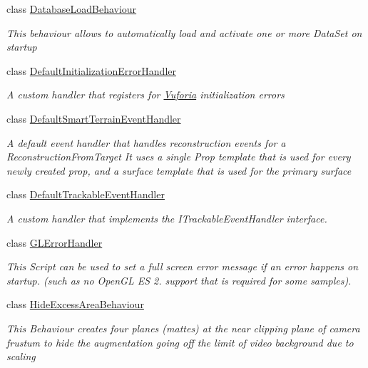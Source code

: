 \begin{DoxyCompactItemize}
class \hyperlink{class_vuforia_1_1_database_load_behaviour}{Database\+Load\+Behaviour}
\begin{DoxyCompactList}\small\item\em This behaviour allows to automatically load and activate one or more Data\+Set on startup \end{DoxyCompactList}\item 
class \hyperlink{class_vuforia_1_1_default_initialization_error_handler}{Default\+Initialization\+Error\+Handler}
\begin{DoxyCompactList}\small\item\em A custom handler that registers for \hyperlink{namespace_vuforia}{Vuforia} initialization errors \end{DoxyCompactList}\item 
class \hyperlink{class_vuforia_1_1_default_smart_terrain_event_handler}{Default\+Smart\+Terrain\+Event\+Handler}
\begin{DoxyCompactList}\small\item\em A default event handler that handles reconstruction events for a Reconstruction\+From\+Target It uses a single Prop template that is used for every newly created prop, and a surface template that is used for the primary surface \end{DoxyCompactList}\item 
class \hyperlink{class_vuforia_1_1_default_trackable_event_handler}{Default\+Trackable\+Event\+Handler}
\begin{DoxyCompactList}\small\item\em A custom handler that implements the I\+Trackable\+Event\+Handler interface. \end{DoxyCompactList}\item 
class \hyperlink{class_vuforia_1_1_g_l_error_handler}{G\+L\+Error\+Handler}
\begin{DoxyCompactList}\small\item\em This Script can be used to set a full screen error message if an error happens on startup. (such as no Open\+G\+L E\+S 2. support that is required for some samples). \end{DoxyCompactList}\item 
class \hyperlink{class_vuforia_1_1_hide_excess_area_behaviour}{Hide\+Excess\+Area\+Behaviour}
\begin{DoxyCompactList}\small\item\em This Behaviour creates four planes (mattes) at the near clipping plane of camera frustum to hide the augmentation going off the limit of video background due to scaling \end{DoxyCompactList}\item 

\end{DoxyCompactItemize}
